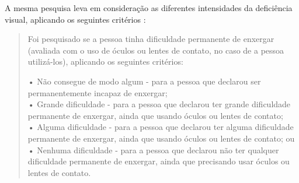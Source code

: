 \documentclass[english,brazilian]{UNISINOSmonografia}
\begin{document}
A mesma pesquisa leva em consideração as diferentes intensidades da deficiência visual, aplicando os seguintes critérios \cite{IBGE2010}: 

\begin{quote}
	Foi pesquisado se a pessoa tinha dificuldade permanente de enxergar (avaliada com o uso de óculos ou lentes de contato, no caso de a pessoa utilizá-los), aplicando os seguintes critérios:
		
	• Não consegue de modo algum - para a pessoa que declarou ser permanentemente incapaz de enxergar; \\
	• Grande dificuldade - para a pessoa que declarou ter grande dificuldade permanente de enxergar, ainda que usando óculos ou lentes de contato; \\
	• Alguma dificuldade - para a pessoa que declarou ter alguma dificuldade permanente de enxergar, ainda que usando óculos ou lentes de contato; ou \\
	• Nenhuma dificuldade - para a pessoa que declarou não ter qualquer dificuldade permanente de enxergar, ainda que precisando usar óculos ou lentes de contato.
\end{quote}
\end{document}
